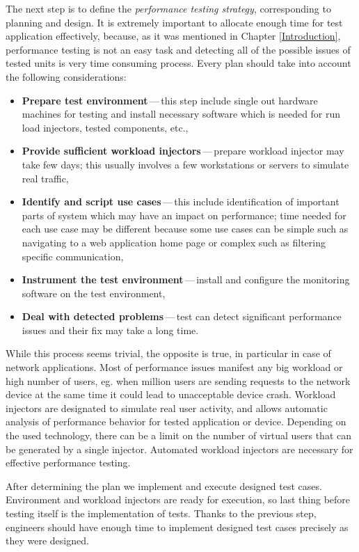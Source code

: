 The next step is to define the \emph{performance testing strategy}, corresponding to planning and design. It is extremely important to allocate enough time for test application effectively, because, as it was mentioned in Chapter \ref{Introduction}, performance testing is not an easy task and detecting all of the possible issues of tested units is very time consuming process. Every plan should take into account the following considerations:

\begin{itemize}
	\setlength\itemsep{0em}
	\item \textbf{Prepare test environment}\,---\,this step include single out hardware machines for testing and install necessary software which is needed for run load injectors, tested components, etc.,
	\item \textbf{Provide sufficient workload injectors}\,---\,prepare workload injector may take few days; this usually involves a few workstations or servers to simulate real traffic,
	\item \textbf{Identify and script use cases}\,---\,this include identification of important parts of system which may have an impact on performance; time needed for each use case may be different because some use cases can be simple such as navigating to a web application home page or complex such as filtering specific communication,
	\item \textbf{Instrument the test environment}\,---\,install and configure the monitoring software on the test environment,
	\item \textbf{Deal with detected problems}\,---\,test can detect significant performance issues and their fix may take a long time.
\end{itemize}

While this process seems trivial, the opposite is true, in particular in case of network applications. Most of performance issues manifest any big workload or high number of users, eg. when million users are sending requests to the network device at the same time it could lead to unacceptable device crash. Workload injectors are designated to simulate real user activity, and allows automatic analysis of performance behavior for tested application or device. Depending on the used technology, there can be a limit on the number of virtual users that can be generated by a single injector. Automated workload injectors are necessary for effective performance testing.

After determining the plan we implement and execute designed test cases. Environment and workload injectors are ready for execution, so last thing before testing itself is the implementation of tests. Thanks to the previous step, engineers should have enough time to implement designed test cases precisely as they were designed. 


